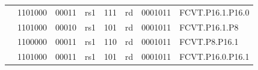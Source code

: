 \begin{table}
\begin{small}
\begin{center}
\begin{tabular}{p{0in}p{0.4in}p{0.05in}p{0.05in}p{0.05in}p{0.05in}p{0.4in}p{0.6in}p{0.4in}p{0.6in}p{0.7in}l}
&
\multicolumn{4}{|c|}{1101000} &
\multicolumn{2}{c|}{00011} &
\multicolumn{1}{c|}{rs1} &
\multicolumn{1}{c|}{111} &
\multicolumn{1}{c|}{rd} &
\multicolumn{1}{c|}{0001011} & FCVT.P16.1.P16.0 \\
\cline{2-11}


&
\multicolumn{4}{|c|}{1101000} &
\multicolumn{2}{c|}{00010} &
\multicolumn{1}{c|}{rs1} &
\multicolumn{1}{c|}{101} &
\multicolumn{1}{c|}{rd} &
\multicolumn{1}{c|}{0001011} & FCVT.P16.1.P8 \\
\cline{2-11}


&
\multicolumn{4}{|c|}{1100000} &
\multicolumn{2}{c|}{00011} &
\multicolumn{1}{c|}{rs1} &
\multicolumn{1}{c|}{110} &
\multicolumn{1}{c|}{rd} &
\multicolumn{1}{c|}{0001011} & FCVT.P8.P16.1 \\
\cline{2-11}


&
\multicolumn{4}{|c|}{1101000} &
\multicolumn{2}{c|}{00011} &
\multicolumn{1}{c|}{rs1} &
\multicolumn{1}{c|}{101} &
\multicolumn{1}{c|}{rd} &
\multicolumn{1}{c|}{0001011} & FCVT.P16.0.P16.1 \\
\cline{2-11}


\end{tabular}
\end{center}
\end{small}
\label{tab:rvxposit}
\end{table}



